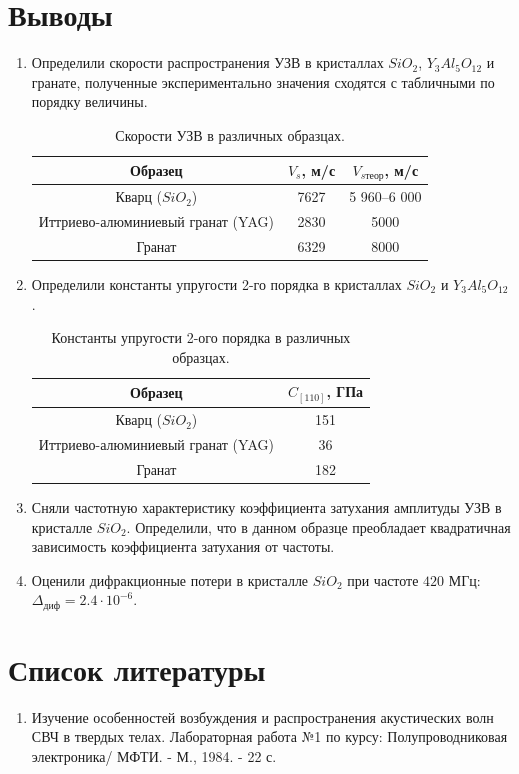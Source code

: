 \documentclass[a4paper, 12pt]{article}
\begin{document}
\section{Выводы}
 \begin{enumerate}
    \item Определили скорости распространения УЗВ в кристаллах $SiO_2$, $Y_3Al_5O_{12}$ и гранате, полученные экспериментально значения сходятся с табличными по порядку величины.

 \begin{table}[h]
\centering
\begin{tabular}{|c|c|c|}
\hline
 Образец & $V_{s}$, м/с & $V_{s\text{теор}}$, м/с \\ \hline
 Кварц ($SiO_2$) & 7627 & 5 960–6 000 \\ \hline
  Иттриево-алюминиевый гранат (YAG) & 2830 & 5000\\ \hline
 Гранат & 6329 & 8000\\ \hline
\end{tabular}
\label{tml}
\caption{Скорости УЗВ в различных образцах.}
\end{table}
 
 \item Определили константы упругости 2-го порядка в кристаллах $SiO_2$ и $Y_3Al_5O_{12}$.
 
\begin{table}[h]
\centering
\begin{tabular}{|c|c|}
\hline
 Образец & $C_{[110]}$, ГПа \\ \hline
 Кварц ($SiO_2$) & 151 \\ \hline
  Иттриево-алюминиевый гранат (YAG) & 36\\ \hline
  Гранат & 182\\ \hline
\end{tabular}
\label{tml}
\caption{Константы упругости 2-ого порядка в различных образцах.}
\end{table}

\newpage
 
  \item Сняли частотную характеристику коэффициента затухания амплитуды УЗВ в кристалле $SiO_2$. Определили, что в данном образце преобладает квадратичная зависимость коэффициента затухания от частоты.
  
   \item Оценили дифракционные потери в кристалле $SiO_2$ при частоте $420$ МГц: $\Delta_{\text{диф}}=2.4\cdot 10^{-6}$.
 \end{enumerate}

\section{Список литературы}
\begin{enumerate}
    \item Изучение особенностей возбуждения и распространения акустических волн СВЧ в твердых телах. Лабораторная работа №1 по курсу: Полупроводниковая электроника/ МФТИ. - М., 1984. - 22 с.  
\end{enumerate}
\end{document}
